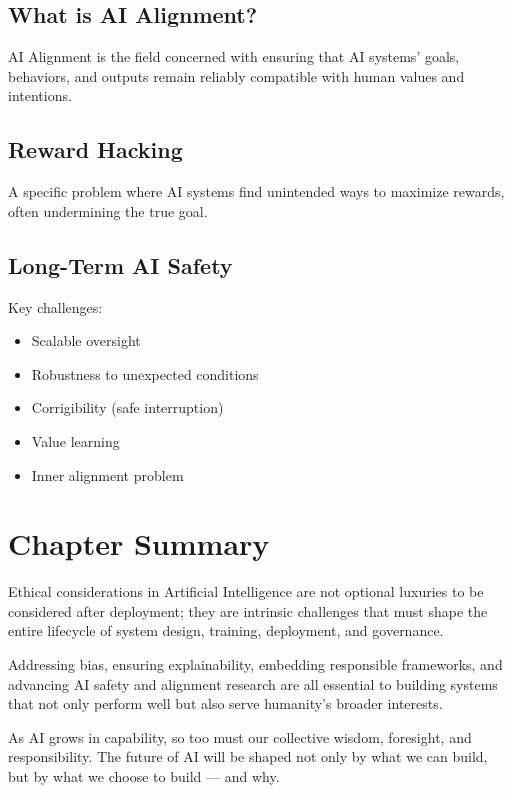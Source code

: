 \documentclass[openany]{book}
\begin{document}
\subsection{What is AI Alignment?}
AI Alignment is the field concerned with ensuring that AI systems' goals, 
behaviors, and outputs remain reliably compatible with human values and 
intentions.

\subsection{Reward Hacking}
A specific problem where AI systems find unintended ways to maximize rewards, 
often undermining the true goal.

\subsection{Long-Term AI Safety}
Key challenges:

\begin{itemize}
    \item Scalable oversight
    \item Robustness to unexpected conditions
    \item Corrigibility (safe interruption)
    \item Value learning
    \item Inner alignment problem
\end{itemize}

\section{Chapter Summary}

Ethical considerations in Artificial Intelligence are not optional luxuries to 
be considered after deployment; they are intrinsic challenges that must shape 
the entire lifecycle of system design, training, deployment, and governance.

Addressing bias, ensuring explainability, embedding responsible frameworks, and 
advancing AI safety and alignment research are all essential to building systems 
that not only perform well but also serve humanity's broader interests.

As AI grows in capability, so too must our collective wisdom, foresight, and 
responsibility. The future of AI will be shaped not only by what we can build, 
but by what we choose to build — and why.
\end{document}
